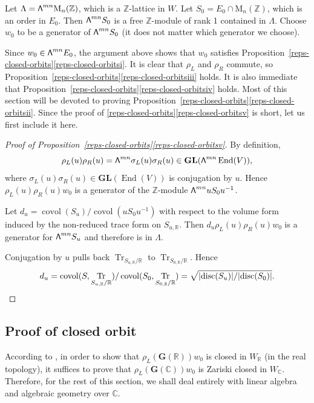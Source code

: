\documentclass[11pt]{article}
\numberwithin{equation}{section}
\newcommand\bw{{\hbox{\large$\mathsf{\Lambda}$}}}
\newcommand{\bC}{\mathbb{C}}
\newcommand{\bR}{\mathbb{R}}
\newcommand{\bZ}{\mathbb{Z}}
\newcommand{\gG}{\mathbf{G}}
\newcommand{\gGL}{\mathbf{GL}}
\newcommand{\rM}{\mathrm{M}}
\DeclareMathOperator{\covol}{covol}
\DeclareMathOperator{\disc}{disc}
\DeclareMathOperator{\End}{End}
\DeclareMathOperator{\Tr}{Tr}
\newcommand{\abs}[1]{\lvert #1 \rvert}
\let\extpower\bw
\begin{document}
Let $\Lambda = \extpower^{mn} \rM_n(\bZ)$, which is a $\bZ$-lattice in $W$.
Let $S_0 = E_0 \cap \rM_n(\bZ)$, which is an order in $E_0$.
Then $\extpower^{mn} S_0$ is a free $\bZ$-module of rank 1 contained in $\Lambda$.
Choose $w_0$ to be a generator of $\extpower^{mn} S_0$ (it does not matter which generator we choose).

Since $w_0 \in \extpower^{mn} E_0$, the argument above shows that $w_0$ satisfies Proposition~\ref{reps-closed-orbits}\eqref{reps-closed-orbitsi}.
It is clear that $\rho_L$ and $\rho_R$ commute, so Proposition~\ref{reps-closed-orbits}\eqref{reps-closed-orbitsiii} holds.
It is also immediate that Proposition~\ref{reps-closed-orbits}\eqref{reps-closed-orbitsiv} holds.
Most of this section will be devoted to proving Proposition~\ref{reps-closed-orbits}\eqref{reps-closed-orbitsii}.
Since the proof of \ref{reps-closed-orbits}\eqref{reps-closed-orbitsv} is short, let us first include it here.

\begin{proof}[Proof of Proposition~\ref{reps-closed-orbits}\eqref{reps-closed-orbitsv}]
By definition,
\[
\rho_L(u) \rho_R(u) = \extpower^{mn} \sigma_L(u)\sigma_R(u) \in \gGL(\extpower^{mn} \End(V)),
\]
where $\sigma_L(u)\sigma_R(u) \in \gGL(\End(V))$ is conjugation by $u$.
Hence $\rho_L(u)\rho_R(u)w_0$ is a generator of the $\bZ$-module $\extpower^{mn} uS_0u^{-1}$.

Let $d_u = \covol(S_u)/\covol(uS_0u^{-1})$ with respect to the volume form induced by the non-reduced trace form on $S_{u,\bR}$.
Then $d_u\rho_L(u)\rho_R(u)w_0$ is a generator for $\extpower^{mn} S_u$ and therefore is in $\Lambda$.

Conjugation by $u$ pulls back $\Tr_{S_{u,\bR}/\bR}$ to $\Tr_{S_{0,\bR}/\bR}$.
Hence
\[
d_u = \covol(S, \Tr_{S_{u,\bR}/\bR})/\covol(S_0, \Tr_{S_{0,\bR}/\bR}) = \sqrt{\abs{\disc(S_u)}/\abs{\disc(S_0)}}.
\qedhere
\]
\end{proof}

\subsection{Proof of closed orbit}

According to \cite[Prop.\,6.3]{BHC62}, in order to show that $\rho_L(\gG(\bR))w_0$ is closed in $W_\bR$ (in the real topology), it suffices to prove that $\rho_L(\gG(\bC))w_0$ is Zariski closed in $W_\bC$.
Therefore, for the rest of this section, we shall deal entirely with linear algebra and algebraic geometry over $\bC$.
\end{document}
